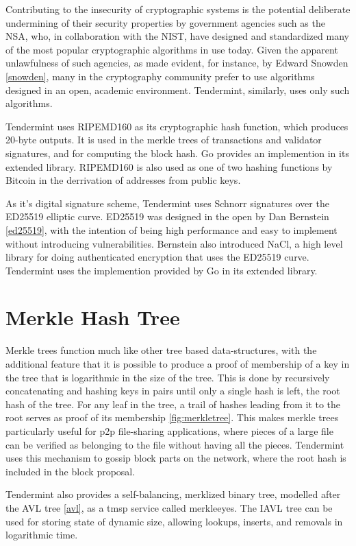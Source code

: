 Contributing to the insecurity of cryptographic systems is the potential deliberate undermining of their security properties by government agencies 
such as the NSA, who, in collaboration with the NIST, have designed and standardized many of the most popular cryptographic algorithms in use today. 
Given the apparent unlawfulness of such agencies, as made evident, for instance, by Edward Snowden \ref{snowden}, 
many in the cryptography community prefer to use algorithms designed in an open, academic environment.
Tendermint, similarly, uses only such algorithms.

Tendermint uses RIPEMD160 as its cryptographic hash function, which produces 20-byte outputs. 
It is used in the merkle trees of transactions and validator signatures, and for computing the block hash.
Go provides an implemention in its extended library. RIPEMD160 is also used as one of two hashing functions by Bitcoin in the derrivation of addresses from public keys.

As it's digital signature scheme, Tendermint uses Schnorr signatures over the ED25519 elliptic curve. 
ED25519 was designed in the open by Dan Bernstein \ref{ed25519}, with the intention of being high performance and easy to implement without introducing vulnerabilities.
Bernstein also introduced NaCl, a high level library for doing authenticated encryption that uses the ED25519 curve. Tendermint uses the implemention provided by Go in its extended library.

\section{Merkle Hash Tree}

Merkle trees function much like other tree based data-structures, 
with the additional feature that it is possible to produce a proof of membership of a key in the tree that is logarithmic in the size of the tree.
This is done by recursively concatenating and hashing keys in pairs until only a single hash is left, the root hash of the tree.
For any leaf in the tree, a trail of hashes leading from it to the root serves as proof of its membership \ref{fig:merkletree}.
This makes merkle trees particularly useful for p2p file-sharing applications, where pieces of a large file can be verified as belonging to the file without
having all the pieces. Tendermint uses this mechanism to gossip block parts on the network, where the root hash is included in the block proposal.

Tendermint also provides a self-balancing, merklized binary tree, modelled after the AVL tree \ref{avl}, as a tmsp service called merkleeyes.
The IAVL tree can be used for storing state of dynamic size, allowing lookups, inserts, and removals in logarithmic time.

